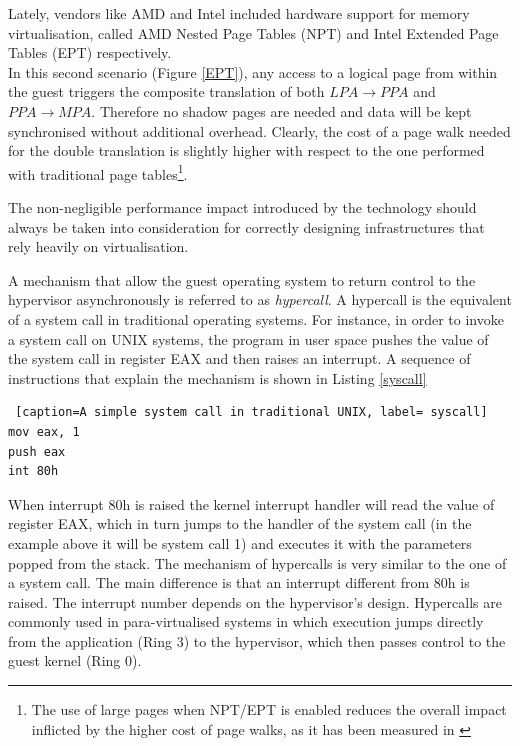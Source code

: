 Lately, vendors like AMD and Intel included hardware support for memory virtualisation, called AMD Nested Page Tables (NPT) and Intel Extended Page Tables (EPT)  respectively.\\ %
In this second scenario (Figure \ref{EPT}), any access to a logical page from within the guest triggers the composite translation of both $LPA \rightarrow PPA$ and $PPA \rightarrow MPA$. Therefore no shadow pages are needed and data will be kept synchronised without additional overhead. Clearly, the cost of a page walk needed for the double translation is slightly higher with respect to the one performed with traditional page tables\footnote{The use of large pages when NPT/EPT is enabled reduces the overall impact inflicted by the higher cost of page walks, as it has been measured in \cite{perfEPT, perfESX} }.  


The non-negligible performance impact introduced by the technology should always be taken into consideration for correctly designing infrastructures that rely heavily on virtualisation.%

A mechanism that allow the guest operating system to return control to the hypervisor asynchronously is referred to as \emph{hypercall}. A hypercall is the equivalent of a system call in traditional operating systems. 
For instance, in order to invoke a system call on UNIX systems, the program in user space pushes the value of the system call in register EAX and then raises an interrupt. A sequence of instructions that explain the mechanism is shown in Listing \ref{syscall}

\begin{lstlisting} [caption=A simple system call in traditional UNIX, label= syscall]
mov eax, 1
push eax
int 80h
\end{lstlisting}

When interrupt 80h is raised the kernel interrupt handler will read the value of register EAX, which in turn jumps to the handler of the system call (in the example above it will be system call 1) and executes it with the parameters popped from the stack.
The mechanism of hypercalls is very similar to the one of a system call. The main difference is that an interrupt different from 80h is raised. The interrupt number depends on the hypervisor's design.
Hypercalls are commonly used in para-virtualised systems in which execution jumps directly from the application (Ring 3) to the hypervisor, which then passes control to the guest kernel (Ring 0). 

